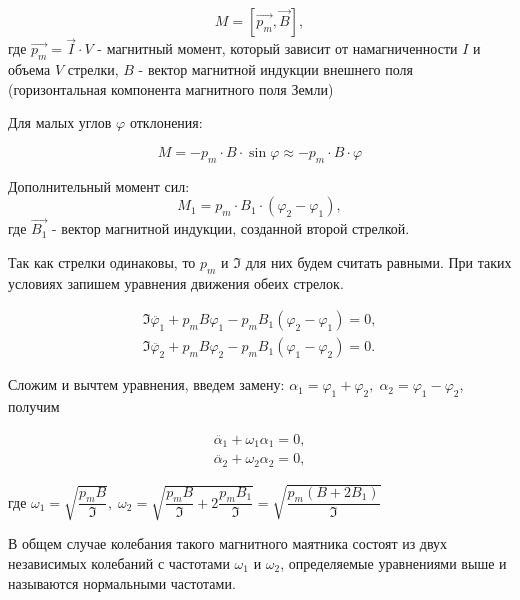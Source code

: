 \documentclass{letask}
\begin{document}
\begin{equation}
M = \left[ \vec{p_m}, \vec{B} \right],
\end{equation}
где $\vec{p_m} = \vec{I} \cdot V$ - магнитный момент, который зависит от намагниченности $I$ и объема $V$ стрелки, $B$ - вектор магнитной индукции внешнего поля (горизонтальная компонента магнитного поля Земли)

Для малых углов $\varphi$ отклонения:

\begin{equation}
M = - p_m \cdot B \cdot \sin \varphi \approx - p_m \cdot B \cdot \varphi
\end{equation}

Дополнительный момент сил:
\begin{equation}
M_1 = p_m \cdot B_1 \cdot (\varphi_2 - \varphi_1),
\end{equation}
где $\vec{B_1}$ - вектор магнитной индукции, созданной второй стрелкой.

Так как стрелки одинаковы, то $p_m$ и $\mathfrak{I}$ для них будем считать равными. При таких условиях запишем уравнения движения обеих стрелок.

\begin{equation}
\begin{gathered}
\mathfrak{I} \ddot{\varphi_1} + p_m B \varphi_1 - p_m B_1 (\varphi_2 - \varphi_1) = 0, \\
\mathfrak{I} \ddot{\varphi_2} + p_m B \varphi_2 - p_m B_1 (\varphi_1 - \varphi_2) = 0.
\end{gathered}
\end{equation}


Сложим и вычтем уравнения, введем замену: $\alpha_1 = \varphi_1 + \varphi_2, \; \alpha_2 = \varphi_1 - \varphi_2$, получим

\begin{equation}
\begin{gathered}
\ddot{\alpha_1} + \omega_1 \alpha_1 = 0, \\
\ddot{\alpha_2} + \omega_2 \alpha_2 = 0,
\end{gathered}
\end{equation}

где $\omega_1 = \sqrt{\dfrac{p_m B}{\mathfrak{I}}}, \; \omega_2 = \sqrt{\dfrac{p_m B}{\mathfrak{I}} + 2\dfrac{p_m B_1}{\mathfrak{I}}} = \sqrt{\dfrac{p_m(B+2B_1)}{\mathfrak{I}}}$

В общем случае колебания такого магнитного маятника состоят из двух независимых колебаний с частотами $\omega_1$ и $\omega_2$, определяемые уравнениями выше и называются нормальными частотами. 
\end{document}
